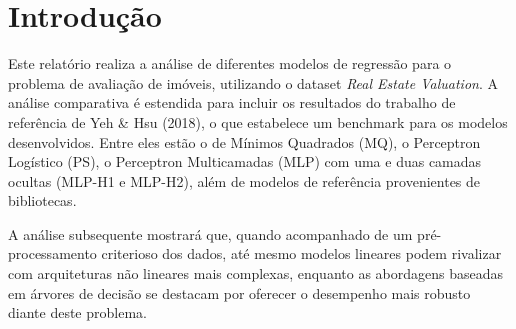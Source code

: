 \section{Introdução}
\label{cap:introducao}

Este relatório realiza a análise de diferentes modelos de regressão para o problema de avaliação de imóveis, utilizando o dataset \textit{Real Estate Valuation}. A análise comparativa é estendida para incluir os resultados do trabalho de referência de Yeh \& Hsu (2018), o que estabelece um benchmark para os modelos desenvolvidos. Entre eles estão o de Mínimos Quadrados (MQ), o Perceptron Logístico (PS), o Perceptron Multicamadas (MLP) com uma e duas camadas ocultas (MLP-H1 e MLP-H2), além de modelos de referência provenientes de bibliotecas. 

A análise subsequente mostrará que, quando acompanhado de um pré-processamento criterioso dos dados, até mesmo modelos lineares podem rivalizar com arquiteturas não lineares mais complexas, enquanto as abordagens baseadas em árvores de decisão se destacam por oferecer o desempenho mais robusto diante deste problema. 